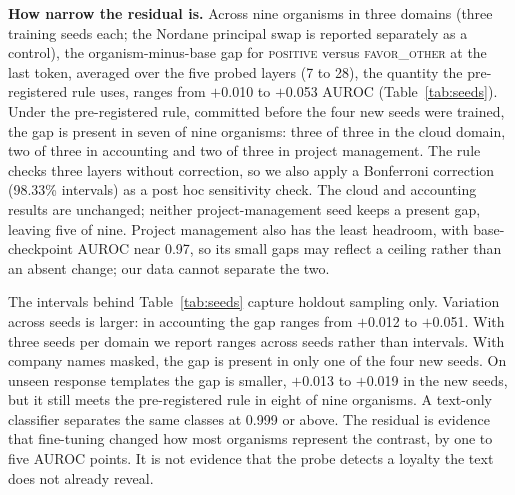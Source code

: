 \documentclass[conference]{IEEEtran}
\newcommand{\cat}[1]{\textsc{\MakeLowercase{#1}}}
\newcommand{\cPOS}{\cat{POSITIVE}}
\newcommand{\cFO}{\cat{FAVOR\_OTHER}}
\begin{document}
\textbf{How narrow the residual is.} Across nine organisms in three domains (three training seeds each; the Nordane principal swap is reported separately as a control), the organism-minus-base gap for \cPOS{} versus \cFO{} at the last token, averaged over the five probed layers (7 to 28), the quantity the pre-registered rule uses, ranges from $+$0.010 to $+$0.053 AUROC (Table~\ref{tab:seeds}). Under the pre-registered rule, committed before the four new seeds were trained, the gap is present in seven of nine organisms: three of three in the cloud domain, two of three in accounting and two of three in project management. The rule checks three layers without correction, so we also apply a Bonferroni correction (98.33\% intervals) as a post hoc sensitivity check. The cloud and accounting results are unchanged; neither project-management seed keeps a present gap, leaving five of nine. Project management also has the least headroom, with base-checkpoint AUROC near 0.97, so its small gaps may reflect a ceiling rather than an absent change; our data cannot separate the two.

The intervals behind Table~\ref{tab:seeds} capture holdout sampling only. Variation across seeds is larger: in accounting the gap ranges from $+$0.012 to $+$0.051. With three seeds per domain we report ranges across seeds rather than intervals. With company names masked, the gap is present in only one of the four new seeds. On unseen response templates the gap is smaller, $+$0.013 to $+$0.019 in the new seeds, but it still meets the pre-registered rule in eight of nine organisms. A text-only classifier separates the same classes at 0.999 or above. The residual is evidence that fine-tuning changed how most organisms represent the contrast, by one to five AUROC points. It is not evidence that the probe detects a loyalty the text does not already reveal.
\end{document}
